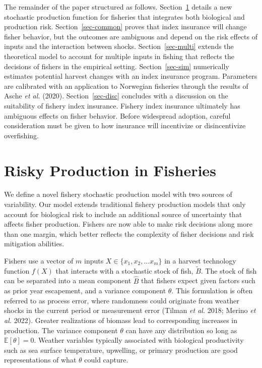 \documentclass[
  letterpaper,
  DIV=11,
  numbers=noendperiod]{scrartcl}
\theoremstyle{plain}
\theoremstyle{plain}
\theoremstyle{remark}
\begin{document}
The remainder of the paper structured as follows. Section~\ref{sec-jp}
details a new stochastic production function for fisheries that
integrates both biological and production risk. Section~\ref{sec-common}
proves that index insurance will change fisher behavior, but the
outcomes are ambiguous and depend on the risk effects of inputs and the
interaction between shocks. Section~\ref{sec-multi} extends the
theoretical model to account for multiple inputs in fishing that
reflects the decisions of fishers in the empirical setting.
Section~\ref{sec-sim} numerically estimates potential harvest changes
with an index insurance program. Parameters are calibrated with an
application to Norwegian fisheries through the results of Asche \emph{et
al.} (2020). Section~\ref{sec-disc} concludes with a discussion on the
suitability of fishery index insurance. Fishery index insurance
ultimately has ambiguous effects on fisher behavior. Before widespread
adoption, careful consideration must be given to how insurance will
incentivize or disincentivize overfishing.

\hypertarget{sec-jp}{%
\section{Risky Production in Fisheries}\label{sec-jp}}

We define a novel fishery stochastic production model with two sources
of variability. Our model extends traditional fishery production models
that only account for biological risk to include an additional source of
uncertainty that affects fisher production. Fishers are now able to make
risk decisions along more than one margin, which better reflects the
complexity of fisher decisions and risk mitigation abilities.

Fishers use a vector of \(m\) inputs \(X\in\{x_1,x_2,...x_m\}\) in a
harvest technology function \(f(X)\) that interacts with a stochastic
stock of fish, \(\tilde B\). The stock of fish can be separated into a
mean component \(\hat{B}\) that fishers expect given factors such as
prior year escapement, and a variance component \(\theta\). This
formulation is often referred to as process error, where randomness
could originate from weather shocks in the current period or measurement
error (Tilman \emph{et al.} 2018; Merino \emph{et al.} 2022). Greater
realizations of biomass lead to corresponding increases in production.
The variance component \(\theta\) can have any distribution so long as
\(\mathbb{E}[\theta]=0\). Weather variables typically associated with
biological productivity such as sea surface temperature, upwelling, or
primary production are good representations of what \(\theta\) could
capture.
\end{document}
